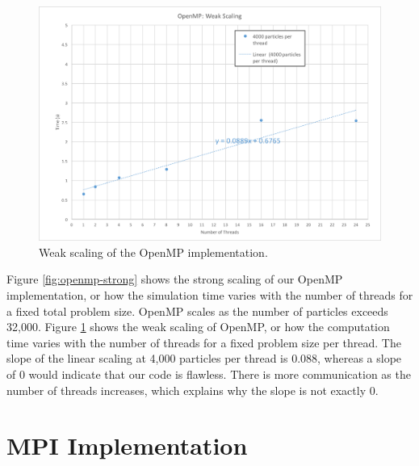 \documentclass[12pt]{article}
\begin{document}
\begin{figure}
	\centering
\includegraphics[width=\textwidth]{graphs/weak_scaling.png}
  \caption{Weak scaling of the OpenMP implementation.}
  \label{fig:openmp-weak}
\end{figure}

Figure \ref{fig:openmp-strong} shows the strong scaling of our OpenMP implementation, or how the simulation time varies with the number of threads for a fixed total problem size. OpenMP scales as the number of particles exceeds 32,000. Figure \ref{fig:openmp-weak} shows the weak scaling of OpenMP, or how the computation time varies with the number of threads for a fixed problem size per thread. The slope of the linear scaling at 4,000 particles per thread is 0.088, whereas a slope of 0 would indicate that our code is flawless. There is more communication as the number of threads increases, which explains why the slope is not exactly 0.

\section{MPI Implementation}
\end{document}
